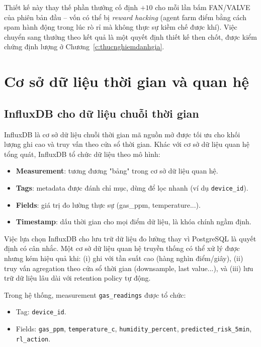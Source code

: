 Thiết kế này thay thế phần thưởng cố định $+10$ cho mỗi lần bấm FAN/VALVE của phiên bản đầu -- vốn có thể bị \textit{reward hacking} (agent farm điểm bằng cách spam hành động trong lúc rò rỉ mà không thực sự kiềm chế được khí). Việc chuyển sang thưởng theo kết quả là một quyết định thiết kế then chốt, được kiểm chứng định lượng ở Chương~\ref{c:thucnghiemdanhgia}.

\section{Cơ sở dữ liệu thời gian và quan hệ}

\subsection{InfluxDB cho dữ liệu chuỗi thời gian}

InfluxDB là cơ sở dữ liệu chuỗi thời gian mã nguồn mở được tối ưu cho khối lượng ghi cao và truy vấn theo cửa sổ thời gian. Khác với cơ sở dữ liệu quan hệ tổng quát, InfluxDB tổ chức dữ liệu theo mô hình:
\begin{itemize}
  \item \textbf{Measurement}: tương đương "bảng" trong cơ sở dữ liệu quan hệ.
  \item \textbf{Tags}: metadata được đánh chỉ mục, dùng để lọc nhanh (ví dụ \texttt{device\_id}).
  \item \textbf{Fields}: giá trị đo lường thực sự (gas\_ppm, temperature...).
  \item \textbf{Timestamp}: dấu thời gian cho mọi điểm dữ liệu, là khóa chính ngầm định.
\end{itemize}

Việc lựa chọn InfluxDB cho lưu trữ dữ liệu đo lường thay vì PostgreSQL là quyết định có cân nhắc. Một cơ sở dữ liệu quan hệ truyền thống có thể xử lý được nhưng kém hiệu quả khi: (i) ghi với tần suất cao (hàng nghìn điểm/giây), (ii) truy vấn agregation theo cửa sổ thời gian (downsample, last value...), và (iii) lưu trữ dữ liệu lâu dài với retention policy tự động.

Trong hệ thống, measurement \texttt{gas\_readings} được tổ chức:
\begin{itemize}
  \item Tag: \texttt{device\_id}.
  \item Fields: \texttt{gas\_ppm}, \texttt{temperature\_c}, \texttt{humidity\_percent}, \texttt{predicted\_risk\_5min}, \texttt{rl\_action}.
\end{itemize}

